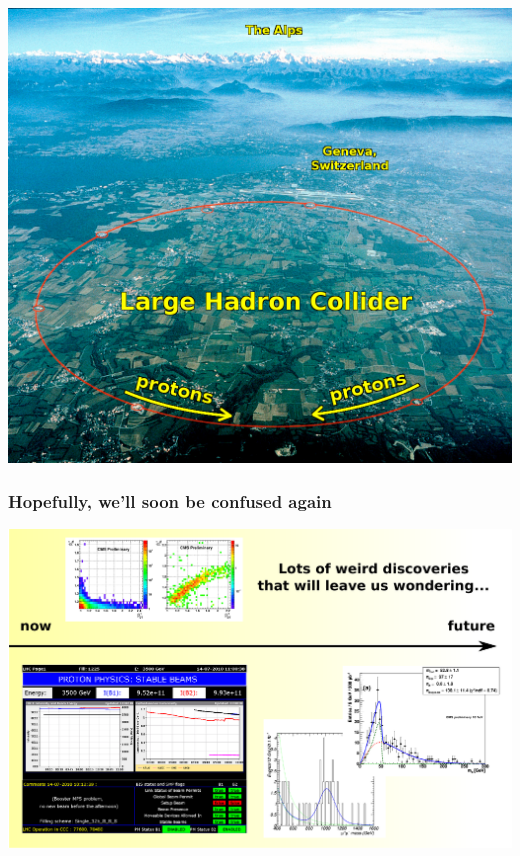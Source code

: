 \documentclass[compress]{beamer}
\begin{document}
\begin{frame}
\includegraphics[width=0.9\linewidth]{cernpanorama.jpg}
\end{frame}

\begin{frame}
\frametitle{Hopefully, we'll soon be confused again}
\includegraphics[width=\linewidth]{timeline6.pdf}
\label{numpages}
\end{frame}
\end{document}
